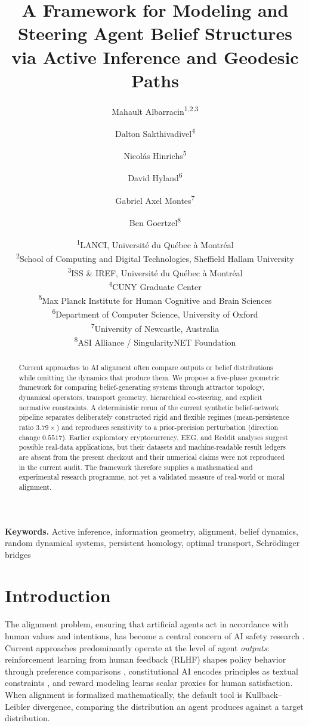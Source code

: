 \documentclass[11pt,a4paper]{article}
\title{A Framework for Modeling and Steering Agent Belief Structures \\ via Active Inference and Geodesic Paths}
\author{
  Mahault Albarracin\textsuperscript{1,2,3} \and
  Dalton Sakthivadivel\textsuperscript{4} \and
  Nicol\'{a}s Hinrichs\textsuperscript{5} \and
  David Hyland\textsuperscript{6} \and
  Gabriel Axel Montes\textsuperscript{7} \and
  Ben Goertzel\textsuperscript{8}
}
\date{
  \textsuperscript{1}LANCI, Universit\'{e} du Qu\'{e}bec \`{a} Montr\'{e}al \\
  \textsuperscript{2}School of Computing and Digital Technologies, Sheffield Hallam University \\
  \textsuperscript{3}ISS \& IREF, Universit\'{e} du Qu\'{e}bec \`{a} Montr\'{e}al \\
  \textsuperscript{4}CUNY Graduate Center \\
  \textsuperscript{5}Max Planck Institute for Human Cognitive and Brain Sciences \\
  \textsuperscript{6}Department of Computer Science, University of Oxford \\
  \textsuperscript{7}University of Newcastle, Australia \\
  \textsuperscript{8}ASI Alliance / SingularityNET Foundation
}
\theoremstyle{definition}
\begin{document}
\maketitle

\begin{abstract}
Current approaches to AI alignment often compare outputs or belief distributions while omitting the dynamics that produce them. We propose a five-phase geometric framework for comparing belief-generating systems through attractor topology, dynamical operators, transport geometry, hierarchical co-steering, and explicit normative constraints. A deterministic rerun of the current synthetic belief-network pipeline separates deliberately constructed rigid and flexible regimes (mean-persistence ratio $3.79\times$) and reproduces sensitivity to a prior-precision perturbation (direction change $0.5517$). Earlier exploratory cryptocurrency, EEG, and Reddit analyses suggest possible real-data applications, but their datasets and machine-readable result ledgers are absent from the present checkout and their numerical claims were not reproduced in the current audit. The framework therefore supplies a mathematical and experimental research programme, not yet a validated measure of real-world or moral alignment.
\end{abstract}

\noindent\textbf{Keywords.} Active inference, information geometry, alignment, belief dynamics, random dynamical systems, persistent homology, optimal transport, Schr\"{o}dinger bridges


\section{Introduction}
\label{sec:introduction}

The alignment problem, ensuring that artificial agents act in accordance with human values and intentions, has become a central concern of AI safety research \citep{gabriel2020artificial, russell2019human}. Current approaches predominantly operate at the level of agent \emph{outputs}: reinforcement learning from human feedback (RLHF) shapes policy behavior through preference comparisons \citep{christiano2017deep, ouyang2022training}, constitutional AI encodes principles as textual constraints \citep{bai2022constitutional}, and reward modeling learns scalar proxies for human satisfaction. When alignment is formalized mathematically, the default tool is Kullback--Leibler divergence, comparing the distribution an agent produces against a target distribution.
\end{document}
